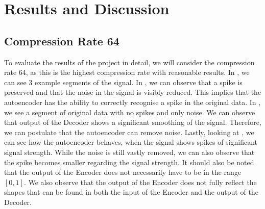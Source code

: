 \section{Results and Discussion}
\label{sec:results}

\subsection{Compression Rate 64} \label{sec:compRate64}
To evaluate the results of the project in detail, we will consider the compression rate 64, as this is the highest compression rate with reasonable results.
In , we can see $3$ example segments of the signal.
In , we can observe that a spike is preserved and that the noise in the signal is visibly reduced.
This implies that the autoencoder has the ability to correctly recognise a spike in the original data.
In , we see a segment of original data with no spikes and only noise. 
We can observe that output of the Decoder shows a significant smoothing of the signal.
Therefore, we can postulate that the autoencoder can remove noise.
Lastly, looking at , we can see how the autoencoder behaves, when the signal shows spikes of significant signal strength.
While the noise is still vastly removed, we can also observe that the spike becomes smaller regarding the signal strength. 
It should also be noted that the output of the Encoder does not necessarily have to be in the range $[0,1]$.
We also observe that the output of the Encoder does not fully reflect the shapes that can be found in both the input of the Encoder and the output of the Decoder.

